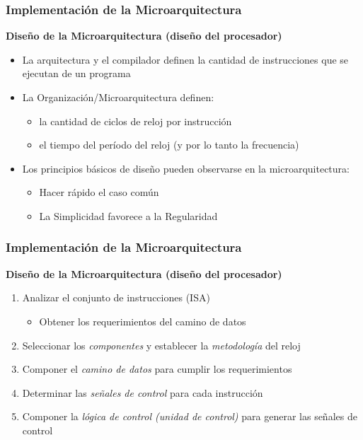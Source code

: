 \documentclass[aspectratio=169,compress]{beamer}
\begin{document}
\begin{footnotesize}
\begin{frame}
\frametitle{Implementación de la Microarquitectura}
\begin{center}\textbf{Diseño de la Microarquitectura (diseño del procesador)}\end{center}
\begin{itemize}
\item La arquitectura y el compilador definen la cantidad de instrucciones que se ejecutan de un programa
\item La Organización/Microarquitectura definen:
\begin{itemize} 
\item la cantidad de ciclos de reloj por instrucción
\item el tiempo del período del reloj (y por lo tanto la frecuencia)
\end{itemize}
\item Los principios básicos de diseño pueden observarse en la microarquitectura: 
\begin{itemize} 
\item Hacer rápido el caso común
\item La Simplicidad favorece a la Regularidad
\end{itemize}
\end{itemize}
\end{frame}



\begin{frame}
\frametitle{Implementación de la Microarquitectura}
\begin{center}\textbf{Diseño de la Microarquitectura (diseño del procesador)}\end{center}
\begin{enumerate}
\item Analizar el conjunto de instrucciones (ISA)
\begin{itemize}
\item Obtener los requerimientos del camino de datos
\end{itemize}
\item Seleccionar los \textit{componentes} y establecer la \textit{metodología} del reloj
\item Componer el \textit{camino de datos} para cumplir los requerimientos
\item Determinar las \textit{señales de control} para cada instrucción
\item Componer la \textit{lógica de control (unidad de control)} para generar las señales de control
\end{enumerate}
\end{frame}




\end{footnotesize}
\end{document}

